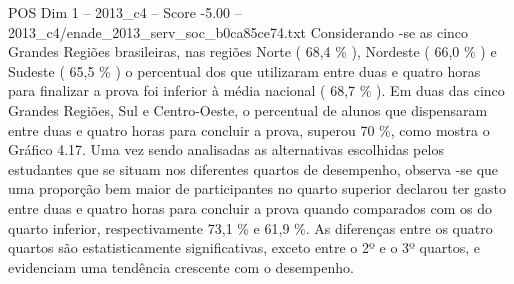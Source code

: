 \begin{textsample}{POS Dim 1 – 2013\_c4 – Score -5.00 – 2013\_c4/enade\_2013\_serv\_soc\_b0ca85ce74.txt}
Considerando -se as cinco Grandes Regiões brasileiras, nas regiões Norte ( 68,4 \% ), Nordeste ( 66,0 \% ) e Sudeste ( 65,5 \% ) o percentual dos que utilizaram entre duas e quatro horas para finalizar a prova foi inferior à média nacional ( 68,7 \% ).
Em duas das cinco Grandes Regiões, Sul e Centro-Oeste, o percentual de alunos que dispensaram entre duas e quatro horas para concluir a prova, superou 70 \%, como mostra o Gráfico 4.17.
Uma vez sendo analisadas as alternativas escolhidas pelos estudantes que se situam nos diferentes quartos de desempenho, observa -se que uma proporção bem maior de participantes no quarto superior declarou ter gasto entre duas e quatro horas para concluir a prova quando comparados com os do quarto inferior, respectivamente 73,1 \% e 61,9 \%.
As diferenças entre os quatro quartos são estatisticamente significativas, exceto entre o 2º e o 3º quartos, e evidenciam uma tendência crescente com o desempenho.

\end{textsample}
